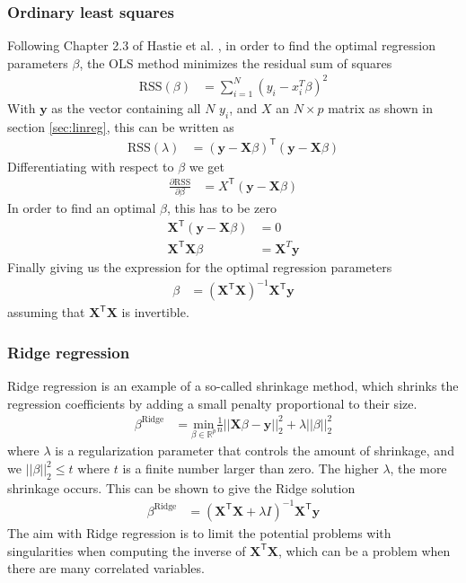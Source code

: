 \documentclass{article}
\newcommand\pd[2]{\frac{\partial #1}{\partial #2}}
\newcommand{\XX}{\mathbf{X}}
\newcommand{\T}{\mathsf{T}}
\begin{document}
\subsubsection{Ordinary least squares}
Following Chapter 2.3 of Hastie et al. \cite{Hastie}, in order to find the optimal regression parameters $\beta$, the OLS method minimizes the residual sum of squares
\begin{align*}
	\text{RSS}(\beta) &= \sum_{i=1}^N(y_i-x_i^T\beta)^2
\end{align*}
With $\bm{y}$ as the vector containing all $N$ $y_i$, and $X$ an $N\times p$ matrix as shown in section \ref{sec:linreg}, this can be written as
\begin{align*}
	\text{RSS}(\lambda) &= (\bm{y} - \XX\beta)^\T(\bm{y}-\XX\beta)
\end{align*}
Differentiating with respect to $\beta$ we get
\begin{align*}
	\pd{\text{RSS}}{\beta} &= X^\T(\bm{y}-\XX\beta)
\end{align*}
In order to find an optimal $\beta$, this has to be zero
\begin{align*}
	\XX^\T(\bm{y}-\XX\beta) &= 0\\
	\XX^\T\XX\beta &= \XX^T\bm{y}
\end{align*}
Finally giving us the expression for the optimal regression parameters
\begin{align*}
	\beta &= (\XX^\T\XX)^{-1}\XX^\T\bm{y}
\end{align*}
assuming that $\XX^\T\XX$ is invertible.

\subsubsection{Ridge regression}
Ridge regression is an example of a so-called shrinkage method, which shrinks the regression coefficients by adding a small penalty proportional to their size.
\begin{align*}
	\beta^{\text{Ridge}} &= \underset{\beta\in \mathbb{R}^{p}}{\text{min}}\frac{1}{n}||\bm{X}\beta - \bm{y}||^2_2 + \lambda||\beta||^2_2
\end{align*}
where $\lambda$ is a regularization parameter that controls the amount of shrinkage, and we $||\beta||^2_2 \leq t$ where $t$ is a finite number larger than zero. The higher $\lambda$, the more shrinkage occurs. This can be shown to give the Ridge solution
\begin{align*}
	\beta^{\text{Ridge}} &= (\XX^\T\XX + \lambda I)^{-1}\XX^\T\bm{y}
\end{align*}
The aim with Ridge regression is to limit the potential problems with singularities when computing the inverse of $\XX^\T\XX$, which can be a problem when there are many correlated variables.
\end{document}
